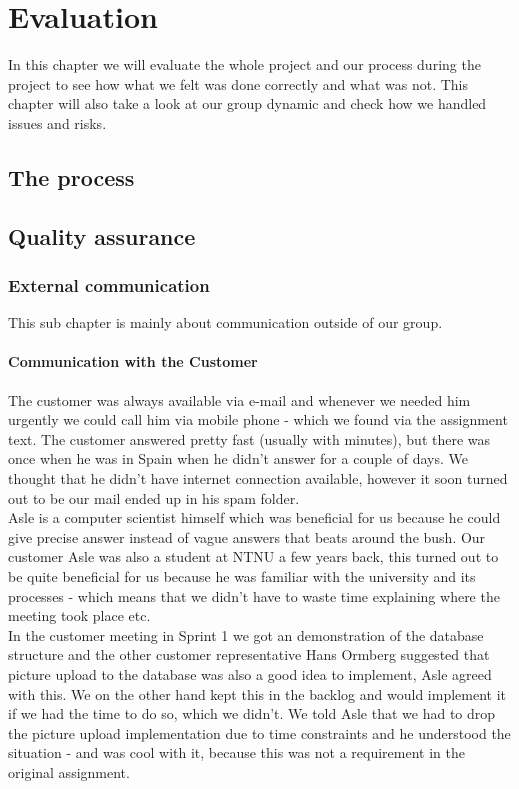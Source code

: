 \section{Evaluation}
In this chapter we will evaluate the whole project and our process during the project to see how what we felt was done correctly and what was not. This chapter will also take a look at our group dynamic and check how we handled issues and risks.

\subsection{The process}


\subsection{Quality assurance}
\subsubsection{External communication}
This sub chapter is mainly about communication outside of our group.
\paragraph{Communication with the Customer}
The customer was always available via e-mail and whenever we needed him urgently we could call him via mobile phone - which we found via the assignment text. The customer answered pretty fast (usually with minutes), but there was once when he was in Spain when he didn't answer for a couple of days. We thought that he didn't have internet connection available, however it soon turned out to be our mail ended up in his spam folder.\\
Asle is a computer scientist himself which was beneficial for us because he could give precise answer instead of vague answers that beats around the bush. Our customer Asle was also a student at NTNU a few years back, this turned out to be quite beneficial for us because he was familiar with the university and its processes - which means that we didn't have to waste time explaining where the meeting took place etc. \\
In the customer meeting in Sprint 1 we got an demonstration of the database structure and the other customer representative Hans Ormberg suggested that picture upload to the database was also a good idea to implement, Asle agreed with this. We on the other hand kept this in the backlog and would implement it if we had the time to do so, which we didn't. We told Asle that we had to drop the picture upload implementation due to time constraints and he understood the situation - and was cool with it, because this was not a requirement in the original assignment.

